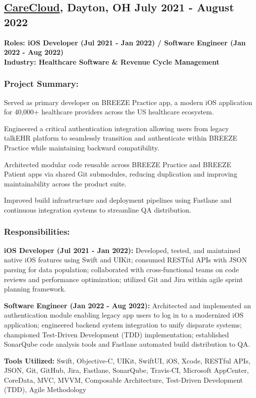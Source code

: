 \subsection{\textbf{\href{http://www.carecloud.com}{CareCloud}, Dayton, OH} \hfill July 2021 - August 2022}
\noindent\textbf{Roles: iOS Developer (Jul 2021 - Jan 2022) / Software Engineer (Jan 2022 - Aug 2022)}\\
\noindent\textbf{Industry: Healthcare Software \& Revenue Cycle Management}

\subsubsection*{\textbf{Project Summary:}}
\begin{zitemize}
\item Served as primary developer on BREEZE Practice app, a modern iOS application for 40,000+ healthcare providers across the US healthcare ecosystem.
\item Engineered a critical authentication integration allowing users from legacy talkEHR platform to seamlessly transition and authenticate within BREEZE Practice while maintaining backward compatibility.
\item Architected modular code reusable across BREEZE Practice and BREEZE Patient apps via shared Git submodules, reducing duplication and improving maintainability across the product suite.
\item Improved build infrastructure and deployment pipelines using Fastlane and continuous integration systems to streamline QA distribution.
\end{zitemize}

\subsubsection*{\textbf{Responsibilities:}}
\begin{zitemize}
\item \textbf{iOS Developer (Jul 2021 - Jan 2022):} Developed, tested, and maintained native iOS features using Swift and UIKit; consumed RESTful APIs with JSON parsing for data population; collaborated with cross-functional teams on code reviews and performance optimization; utilized Git and Jira within agile sprint planning framework.
\item \textbf{Software Engineer (Jan 2022 - Aug 2022):} Architected and implemented an authentication module enabling legacy app users to log in to a modernized iOS application; engineered backend system integration to unify disparate systems; championed Test-Driven Development (TDD) implementation; established SonarQube code analysis tools and Fastlane automated build distribution to QA.
\end{zitemize}

\noindent\textbf{Tools Utilized:} Swift, Objective-C, UIKit, SwiftUI, iOS, Xcode, RESTful APIs, JSON, Git, GitHub, Jira, Fastlane, SonarQube, Travis-CI, Microsoft AppCenter, CoreData, MVC, MVVM, Composable Architecture, Test-Driven Development (TDD), Agile Methodology
